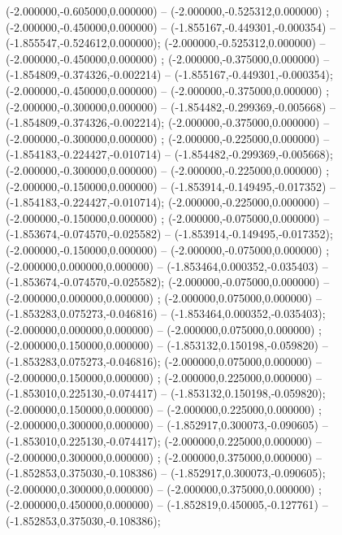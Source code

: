  (-2.000000,-0.605000,0.000000) -- (-2.000000,-0.525312,0.000000) ;
 (-2.000000,-0.450000,0.000000) -- (-1.855167,-0.449301,-0.000354) -- (-1.855547,-0.524612,0.000000);
 (-2.000000,-0.525312,0.000000) -- (-2.000000,-0.450000,0.000000) ;
 (-2.000000,-0.375000,0.000000) -- (-1.854809,-0.374326,-0.002214) -- (-1.855167,-0.449301,-0.000354);
 (-2.000000,-0.450000,0.000000) -- (-2.000000,-0.375000,0.000000) ;
 (-2.000000,-0.300000,0.000000) -- (-1.854482,-0.299369,-0.005668) -- (-1.854809,-0.374326,-0.002214);
 (-2.000000,-0.375000,0.000000) -- (-2.000000,-0.300000,0.000000) ;
 (-2.000000,-0.225000,0.000000) -- (-1.854183,-0.224427,-0.010714) -- (-1.854482,-0.299369,-0.005668);
 (-2.000000,-0.300000,0.000000) -- (-2.000000,-0.225000,0.000000) ;
 (-2.000000,-0.150000,0.000000) -- (-1.853914,-0.149495,-0.017352) -- (-1.854183,-0.224427,-0.010714);
 (-2.000000,-0.225000,0.000000) -- (-2.000000,-0.150000,0.000000) ;
 (-2.000000,-0.075000,0.000000) -- (-1.853674,-0.074570,-0.025582) -- (-1.853914,-0.149495,-0.017352);
 (-2.000000,-0.150000,0.000000) -- (-2.000000,-0.075000,0.000000) ;
 (-2.000000,0.000000,0.000000) -- (-1.853464,0.000352,-0.035403) -- (-1.853674,-0.074570,-0.025582);
 (-2.000000,-0.075000,0.000000) -- (-2.000000,0.000000,0.000000) ;
 (-2.000000,0.075000,0.000000) -- (-1.853283,0.075273,-0.046816) -- (-1.853464,0.000352,-0.035403);
 (-2.000000,0.000000,0.000000) -- (-2.000000,0.075000,0.000000) ;
 (-2.000000,0.150000,0.000000) -- (-1.853132,0.150198,-0.059820) -- (-1.853283,0.075273,-0.046816);
 (-2.000000,0.075000,0.000000) -- (-2.000000,0.150000,0.000000) ;
 (-2.000000,0.225000,0.000000) -- (-1.853010,0.225130,-0.074417) -- (-1.853132,0.150198,-0.059820);
 (-2.000000,0.150000,0.000000) -- (-2.000000,0.225000,0.000000) ;
 (-2.000000,0.300000,0.000000) -- (-1.852917,0.300073,-0.090605) -- (-1.853010,0.225130,-0.074417);
 (-2.000000,0.225000,0.000000) -- (-2.000000,0.300000,0.000000) ;
 (-2.000000,0.375000,0.000000) -- (-1.852853,0.375030,-0.108386) -- (-1.852917,0.300073,-0.090605);
 (-2.000000,0.300000,0.000000) -- (-2.000000,0.375000,0.000000) ;
 (-2.000000,0.450000,0.000000) -- (-1.852819,0.450005,-0.127761) -- (-1.852853,0.375030,-0.108386);

